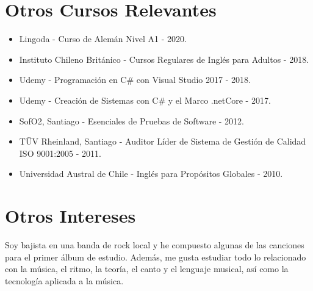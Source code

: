 \documentclass[a4paper,10pt]{article}
\begin{document}
\section*{Otros Cursos Relevantes}
\begin{itemize}[left=0em]
    \item Lingoda - Curso de Alemán Nivel A1 - 2020.
    \item Instituto Chileno Británico - Cursos Regulares de Inglés para Adultos - 2018.
    \item Udemy - Programación en C# con Visual Studio 2017 - 2018.
    \item Udemy - Creación de Sistemas con C# y el Marco .netCore - 2017.
    \item SofO2, Santiago - Esenciales de Pruebas de Software - 2012.
    \item TÜV Rheinland, Santiago - Auditor Líder de Sistema de Gestión de Calidad ISO 9001:2005 - 2011.
    \item Universidad Austral de Chile - Inglés para Propósitos Globales - 2010.
\end{itemize}

\section*{Otros Intereses}
Soy bajista en una banda de rock local y he compuesto algunas de las canciones para el primer álbum de estudio. Además, me gusta estudiar todo lo relacionado con la música, el ritmo, la teoría, el canto y el lenguaje musical, así como la tecnología aplicada a la música.
\end{document}
